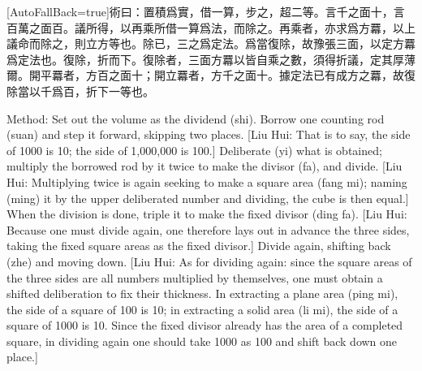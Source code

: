 \documentclass[11pt]{article}
\newcommand{\zhsmall}{\footnotesize\color{black!70}}
\newcommand{\unitlabel}[1]{\marginpar{\raggedleft\tiny\color{gray}#1}}
\newenvironment{unitzh}{\par\CJKfontspec{Noto Serif CJK SC}[AutoFallBack=true]\large\linespread{1.25}\selectfont}{\par}
\newenvironment{uniten}{\par\small\color{black!85}}{\par\medskip}
\begin{document}
\begin{unitzh}\unitlabel{jiuzhang-016.11}術曰：置積爲實，借一算，步之，超二等。{\zhsmall 言千之面十，言百萬之面百。}議所得，以再乘所借一算爲法，而除之。{\zhsmall 再乘者，亦求爲方羃，以上議命而除之，則立方等也。}除已，三之爲定法。{\zhsmall 爲當復除，故豫張三面，以定方羃爲定法也。}復除，折而下。{\zhsmall 復除者，三面方羃以皆自乘之數，須得折議，定其厚薄爾。開平羃者，方百之面十；開立羃者，方千之面十。據定法已有成方之羃，故復除當以千爲百，折下一等也。}\end{unitzh}
\begin{uniten}Method: Set out the volume as the dividend (shi). Borrow one counting rod (suan) and step it forward, skipping two places. [Liu Hui: That is to say, the side of 1000 is 10; the side of 1,000,000 is 100.] Deliberate (yi) what is obtained; multiply the borrowed rod by it twice to make the divisor (fa), and divide. [Liu Hui: Multiplying twice is again seeking to make a square area (fang mi); naming (ming) it by the upper deliberated number and dividing, the cube is then equal.] When the division is done, triple it to make the fixed divisor (ding fa). [Liu Hui: Because one must divide again, one therefore lays out in advance the three sides, taking the fixed square areas as the fixed divisor.] Divide again, shifting back (zhe) and moving down. [Liu Hui: As for dividing again: since the square areas of the three sides are all numbers multiplied by themselves, one must obtain a shifted deliberation to fix their thickness. In extracting a plane area (ping mi), the side of a square of 100 is 10; in extracting a solid area (li mi), the side of a square of 1000 is 10. Since the fixed divisor already has the area of a completed square, in dividing again one should take 1000 as 100 and shift back down one place.]\end{uniten}
\end{document}
